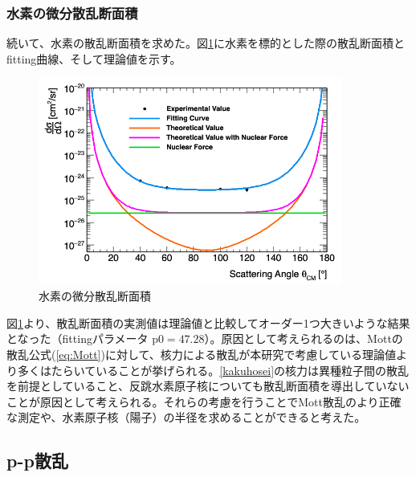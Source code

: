 \documentclass[a4paper,11pt,dvipdfmx]{jsarticle}
\begin{document}
\newpage
\subsubsection{水素の微分散乱断面積}
続いて、水素の散乱断面積を求めた。図\ref{expmott}に水素を標的とした際の散乱断面積とfitting曲線、そして理論値を示す。
\begin{figure}[H]
\centering
\includegraphics[width=100mm]{picture/jan/H2.png}
\caption{水素の微分散乱断面積}
\label{expmott}
\end{figure}
図\ref{expmott}より、散乱断面積の実測値は理論値と比較してオーダー1つ大きいような結果となった（fittingパラメータ p0$=47.28$）。原因として考えられるのは、Mottの散乱公式(\ref{eq:Mott})に対して、核力による散乱が本研究で考慮している理論値より多くはたらいていることが挙げられる。\ref{kakuhosei}の核力は異種粒子間の散乱を前提としていること、反跳水素原子核についても散乱断面積を導出していないことが原因として考えられる。それらの考慮を行うことでMott散乱のより正確な測定や、水素原子核（陽子）の半径を求めることができると考えた。


\newpage
\subsection{p-p散乱}
\end{document}
